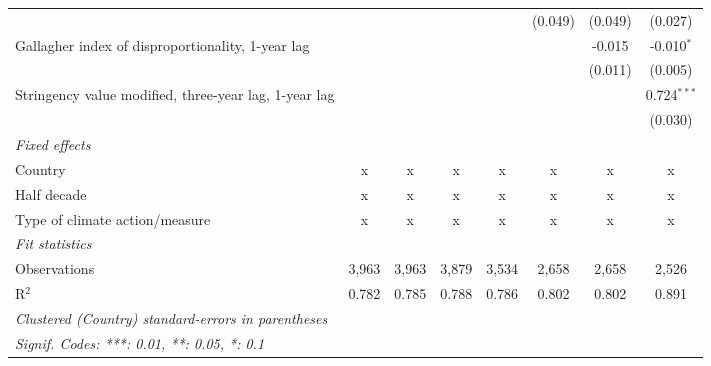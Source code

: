 \begin{table}[htbp]
\begin{tabular}{lccccccc}
                                                            &               &              &              &              & (0.049)       & (0.049)       & (0.027)\\   
      Gallagher index of disproportionality, 1-year lag     &               &              &              &              &               & -0.015        & -0.010$^{*}$\\   
                                                            &               &              &              &              &               & (0.011)       & (0.005)\\   
      Stringency value modified, three-year lag, 1-year lag &               &              &              &              &               &               & 0.724$^{***}$\\   
                                                            &               &              &              &              &               &               & (0.030)\\   
      \emph{Fixed effects}\\
      Country                                               & x             & x            & x            & x            & x             & x             & x\\  
      Half decade                                           & x             & x            & x            & x            & x             & x             & x\\  
      Type of climate action/measure                        & x             & x            & x            & x            & x             & x             & x\\  
      \midrule \emph{Fit statistics}\\
      Observations                                          & 3,963         & 3,963        & 3,879        & 3,534        & 2,658         & 2,658         & 2,526\\  
      R$^2$                                                 & 0.782         & 0.785        & 0.788        & 0.786        & 0.802         & 0.802         & 0.891\\  
      \midrule
      \multicolumn{8}{l}{\emph{Clustered (Country) standard-errors in parentheses}}\\
      \multicolumn{8}{l}{\emph{Signif. Codes: ***: 0.01, **: 0.05, *: 0.1}}\\
   \end{tabular}
\end{table}


